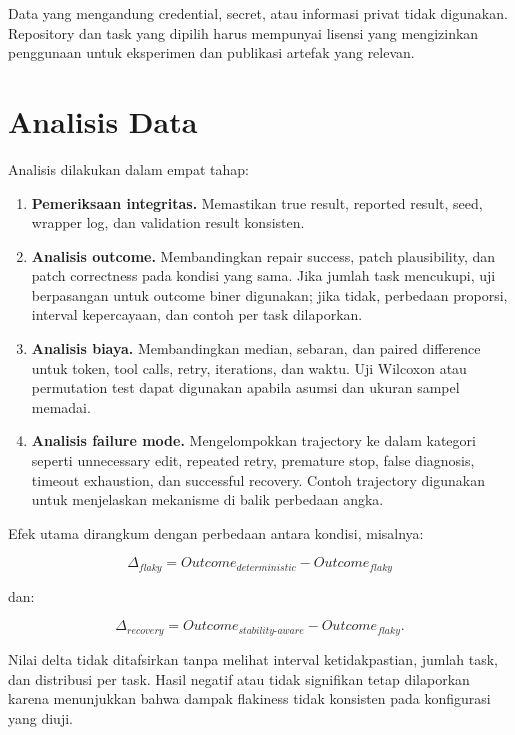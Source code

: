 Data yang mengandung credential, secret, atau informasi privat tidak digunakan. Repository dan task yang dipilih harus mempunyai lisensi yang mengizinkan penggunaan untuk eksperimen dan publikasi artefak yang relevan.

\section{Analisis Data}

Analisis dilakukan dalam empat tahap:

\begin{enumerate}[leftmargin=*]
    \item \textbf{Pemeriksaan integritas.} Memastikan true result, reported result, seed, wrapper log, dan validation result konsisten.
    \item \textbf{Analisis outcome.} Membandingkan repair success, patch plausibility, dan patch correctness pada kondisi yang sama. Jika jumlah task mencukupi, uji berpasangan untuk outcome biner digunakan; jika tidak, perbedaan proporsi, interval kepercayaan, dan contoh per task dilaporkan.
    \item \textbf{Analisis biaya.} Membandingkan median, sebaran, dan paired difference untuk token, tool calls, retry, iterations, dan waktu. Uji Wilcoxon atau permutation test dapat digunakan apabila asumsi dan ukuran sampel memadai.
    \item \textbf{Analisis failure mode.} Mengelompokkan trajectory ke dalam kategori seperti unnecessary edit, repeated retry, premature stop, false diagnosis, timeout exhaustion, dan successful recovery. Contoh trajectory digunakan untuk menjelaskan mekanisme di balik perbedaan angka.
\end{enumerate}

Efek utama dirangkum dengan perbedaan antara kondisi, misalnya:

\begin{equation}
\Delta_{flaky} = Outcome_{deterministic} - Outcome_{flaky}
\end{equation}

dan:

\begin{equation}
\Delta_{recovery} = Outcome_{stability\text{-}aware} - Outcome_{flaky}.
\end{equation}

Nilai delta tidak ditafsirkan tanpa melihat interval ketidakpastian, jumlah task, dan distribusi per task. Hasil negatif atau tidak signifikan tetap dilaporkan karena menunjukkan bahwa dampak flakiness tidak konsisten pada konfigurasi yang diuji.

